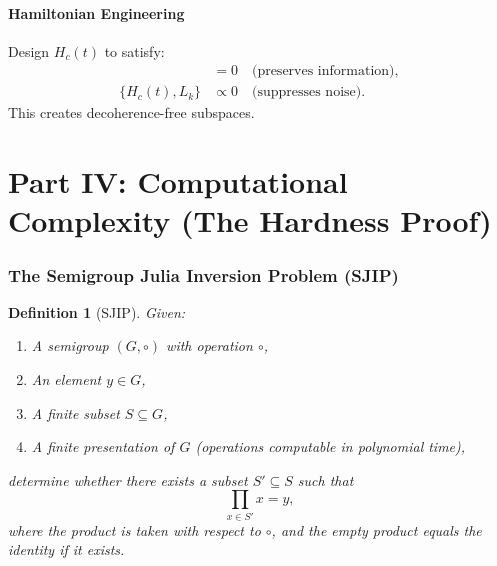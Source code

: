 \documentclass[12pt]{article}
\newtheorem{definition}[theorem]{Definition}
\begin{document}
\subsection{Hamiltonian Engineering}
Design $H_c(t)$ to satisfy:
\begin{align}
    [H_c(t), H_{\text{signal}}] &= 0 \quad \text{(preserves information)}, \\
    \{H_c(t), L_k\} &\propto 0 \quad \text{(suppresses noise)}.
\end{align}
This creates decoherence-free subspaces.

\part*{Part IV: Computational Complexity (The Hardness Proof)}

\section{The Semigroup Julia Inversion Problem (SJIP)}
\begin{definition}[SJIP]
    Given:
    \begin{enumerate}
        \item A semigroup $(G, \circ)$ with operation $\circ$,
        \item An element $y \in G$,
        \item A finite subset $S \subseteq G$,
        \item A finite presentation of $G$ (operations computable in polynomial time),
    \end{enumerate}
    determine whether there exists a subset $S' \subseteq S$ such that
    \begin{equation}
        \prod_{x \in S'} x = y,
    \end{equation}
    where the product is taken with respect to $\circ$, and the empty product equals the identity if it exists.
\end{definition}
\end{document}

